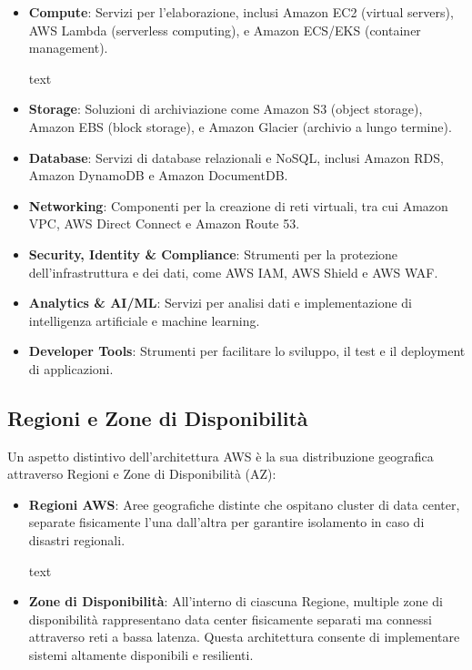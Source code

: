 \documentclass[a4paper,12pt]{report}
\begin{document}
\begin{itemize}
\item \textbf{Compute}: Servizi per l'elaborazione, inclusi Amazon EC2 (virtual servers), AWS Lambda (serverless computing), e Amazon ECS/EKS (container management).

text
\item \textbf{Storage}: Soluzioni di archiviazione come Amazon S3 (object storage), Amazon EBS (block storage), e Amazon Glacier (archivio a lungo termine).

\item \textbf{Database}: Servizi di database relazionali e NoSQL, inclusi Amazon RDS, Amazon DynamoDB e Amazon DocumentDB.

\item \textbf{Networking}: Componenti per la creazione di reti virtuali, tra cui Amazon VPC, AWS Direct Connect e Amazon Route 53.

\item \textbf{Security, Identity \& Compliance}: Strumenti per la protezione dell'infrastruttura e dei dati, come AWS IAM, AWS Shield e AWS WAF.

\item \textbf{Analytics \& AI/ML}: Servizi per analisi dati e implementazione di intelligenza artificiale e machine learning.

\item \textbf{Developer Tools}: Strumenti per facilitare lo sviluppo, il test e il deployment di applicazioni.
\end{itemize}

\subsection{Regioni e Zone di Disponibilità}

Un aspetto distintivo dell'architettura AWS è la sua distribuzione geografica attraverso Regioni e Zone di Disponibilità (AZ):

\begin{itemize}
\item \textbf{Regioni AWS}: Aree geografiche distinte che ospitano cluster di data center, separate fisicamente l'una dall'altra per garantire isolamento in caso di disastri regionali.

text
\item \textbf{Zone di Disponibilità}: All'interno di ciascuna Regione, multiple zone di disponibilità rappresentano data center fisicamente separati ma connessi attraverso reti a bassa latenza. Questa architettura consente di implementare sistemi altamente disponibili e resilienti.
\end{itemize}
\end{document}
